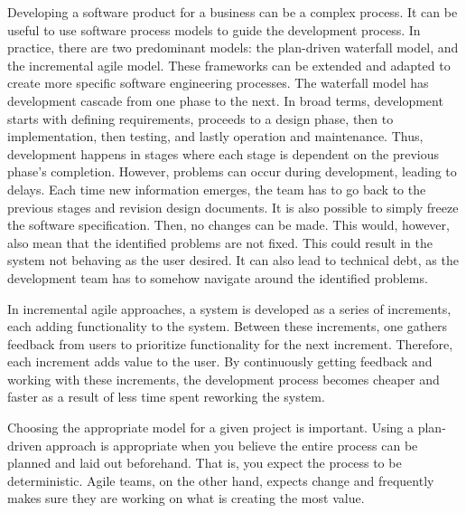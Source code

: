 
Developing a software product for a business can be a complex process.
It can be useful to use software process models to guide the development process.
In practice, there are two predominant models: the plan-driven waterfall model, and the incremental agile model.
These frameworks can be extended and adapted to create more specific software engineering processes.\cite{sommervilleSoftwareEngineering2016}
The waterfall model has development cascade from one phase to the next.
In broad terms, development starts with defining requirements, proceeds to a design phase, then to implementation, then testing, and lastly operation and maintenance.
Thus, development happens in stages where each stage is dependent on the previous phase's completion.
However, problems can occur during development, leading to delays.
Each time new information emerges, the team has to go back to the previous stages and revision design documents.
It is also possible to simply freeze the software specification. Then, no changes can be made. 
This would, however, also mean that the identified problems are not fixed. This could result in the system not behaving as the user desired. 
It can also lead to technical debt, as the development team has to somehow navigate around the identified problems.

In incremental agile approaches, a system is developed as a series of increments, each adding functionality to the system. 
Between these increments, one gathers feedback from users to prioritize functionality for the next increment. Therefore, each increment adds value to the user. 
By continuously getting feedback and working with these increments, the development process becomes cheaper and faster as a result of less time spent reworking the system.\cite{sommervilleSoftwareEngineering2016}

Choosing the appropriate model for a given project is important.
Using a plan-driven approach is appropriate when you believe the entire process can be planned and laid out beforehand. 
That is, you expect the process to be deterministic.
Agile teams, on the other hand, expects change and frequently makes sure they are working on what is creating the most value.

